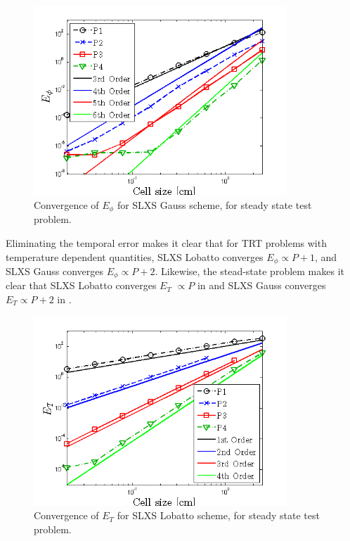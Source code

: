 \begin{figure}[!hbp]
\centering
\includegraphics[width=9.5cm]{chapter6_grey_radtran/Dissertation_Data/Constant_Time_SLXS_Gauss_phi_L2.png}
\caption{Convergence of $E_{\phi}$ for SLXS Gauss scheme, for steady state test problem.}
\label{fig:constant_time_gauss_phi}
\end{figure}
Eliminating the temporal error makes it clear that for TRT problems with temperature dependent quantities, SLXS Lobatto converges $E_{\phi} \propto P+1$, and SLXS Gauss converges $E_{\phi} \propto P+2$.  
Likewise, the stead-state problem makes it clear that SLXS Lobatto converges $E_T$ $\propto P$ in  and SLXS Gauss converges $E_T \propto P+2$ in .
\begin{figure}[!htp]
\centering
\includegraphics[width=9.5cm]{chapter6_grey_radtran/Dissertation_Data/Constant_Time_SLXS_Lobatto_temp_L2.png}
\caption{Convergence of $E_{T}$ for SLXS Lobatto scheme, for steady state test problem.}
\label{fig:constant_time_lobatto_t}
\end{figure}

